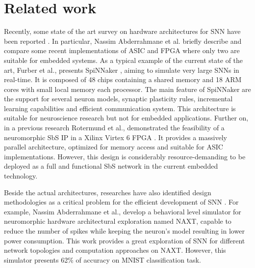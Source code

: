 \section{Related work}

Recently, some state of the art survey on hardware architectures for SNN have been reported \cite{Design_Exploration_SbS_Trans20, SNN_Survey_Trans19}. In particular, Nassim Abderrahmane et al. briefly describe and compare some recent implementations of ASIC and FPGA where only two are suitable for embedded systems. As a typical example of the current state of the art, Furber et al., presents SpiNNaker \cite{Spinnaker_Trans13}, aiming to simulate very large SNNs in real-time. It is composed of 48 chips containing a shared memory and 18 ARM cores with small local memory each processor. The main feature of SpiNNaker are the support for several neuron models, synaptic plasticity rules, incremental learning capabilities and efficient communication system. This architecture is suitable for neuroscience research but not for embedded applications. Further on, in a previous research Rotermund et al., demonstrated the feasibility of a neuromorphic SbS IP in a Xilinx Virtex 6 FPGA \cite{rotermund2018massively}. It provides a massively parallel architecture, optimized for memory access and suitable for ASIC implementations. However, this design is considerably resource-demanding to be deployed as a full and functional SbS network in the current embedded technology.

Beside the actual architectures, researches have also identified design methodologies as a critical problem for the efficient development of SNN \cite{Design_Exploration_SbS_Trans20}. For example, Nassim Abderrahmane et al., develop a behavioral level simulator for neuromorphic hardware architectural exploration named NAXT, capable to reduce the number of spikes while keeping the neuron's model resulting in lower power consumption. This work provides a great exploration of SNN for different network topologies and computation approaches on NAXT. However, this simulator presents 62\% of accuracy on MNIST classification task.
